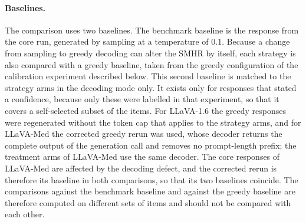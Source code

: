 \documentclass[11pt,a4paper]{article}
\newcommand{\SMHR}{\ensuremath{\mathrm{SMHR}}}
\begin{document}
\paragraph{Baselines.} The comparison uses two baselines. The benchmark baseline is the response from the core run, generated by sampling at a temperature of 0.1. Because a change from sampling to greedy decoding can alter the \SMHR{} by itself, each strategy is also compared with a greedy baseline, taken from the greedy configuration of the calibration experiment described below. This second baseline is matched to the strategy arms in the decoding mode only. It exists only for responses that stated a confidence, because only these were labelled in that experiment, so that it covers a self-selected subset of the items. For LLaVA-1.6 the greedy responses were regenerated without the token cap that applies to the strategy arms, and for LLaVA-Med the corrected greedy rerun was used, whose decoder returns the complete output of the generation call and removes no prompt-length prefix; the treatment arms of LLaVA-Med use the same decoder. The core responses of LLaVA-Med are affected by the decoding defect, and the corrected rerun is therefore its baseline in both comparisons, so that its two baselines coincide. The comparisons against the benchmark baseline and against the greedy baseline are therefore computed on different sets of items and should not be compared with each other.
\end{document}
